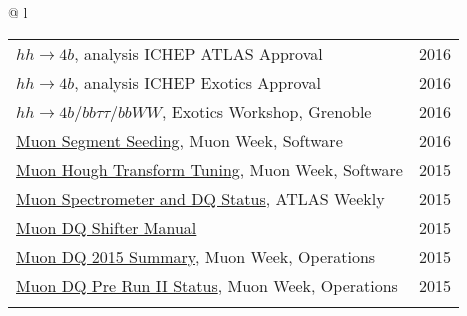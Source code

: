 \documentclass[letterpaper,11pt,oneside]{article}
\newcommand{\blue}[1]{\textcolor[rgb]{0,0,0.9}{#1}}
\begin{document}
\begin{flushleft}
\begin{tabular}{@{} l}
     \begin{tabular}{@{} l l }
     \blue{\href{https://indico.cern.ch/event/558982/contributions/2255258}{$hh\to4b$}}, analysis ICHEP ATLAS Approval & 2016\\
     \blue{\href{https://indico.cern.ch/event/556566/contributions/2244051}{$hh\to4b$}}, analysis ICHEP Exotics Approval & 2016\\
     \blue{\href{https://indico.cern.ch/event/465157/contributions/1972449}{$hh\to4b / bb\tau\tau / bbWW$}}, Exotics Workshop, Grenoble & 2016\\
      \blue{\href{https://indico.cern.ch/event/570115/contributions/2305843}{Muon Segment Seeding}}, Muon Week, Software & 2016\\
     \blue{\href{https://indico.cern.ch/event/465396/contributions/1984207}{Muon Hough Transform Tuning}}, Muon Week, Software & 2015\\
     \blue{\href{https://indico.cern.ch/event/444054/contributions/1099850}{Muon Spectrometer and DQ Status}}, ATLAS Weekly & 2015\\
     \blue{\href{https://twiki.cern.ch/twiki/pub/Atlas/MuonOfflineDQShiftInstructions/Muondq_instruction_tony_2015spring.pdf}{Muon DQ Shifter Manual}} & 2015\\
     \blue{\href{https://indico.cern.ch/event/464848/contributions/1983327}{Muon DQ 2015 Summary}}, Muon Week, Operations & 2015\\
     \blue{\href{https://indico.cern.ch/event/376175/contributions/893495}{Muon DQ Pre Run II Status}}, Muon Week, Operations & 2015\\
     \hspace{0.7\linewidth} & \hspace{0.1\linewidth} \\
      \end{tabular}
      \end{tabular}
\end{flushleft}
\end{document}
